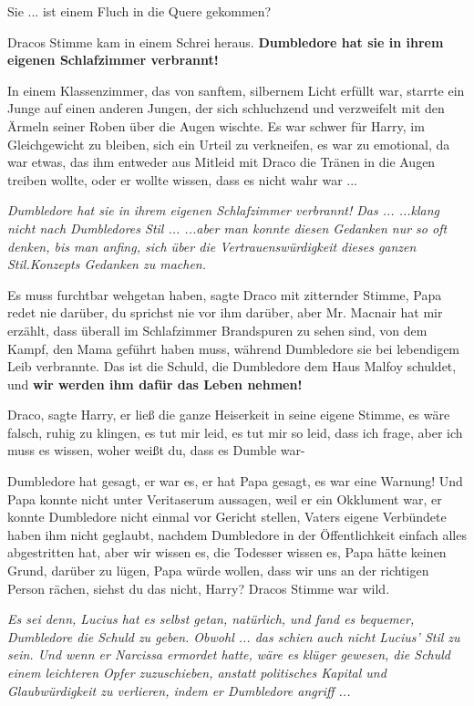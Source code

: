 \glqq{}Sie ... ist einem Fluch in die Quere gekommen?\grqq{}

Dracos Stimme kam in einem Schrei heraus. \glqq{}\textbf{Dumbledore hat sie in
ihrem eigenen Schlafzimmer verbrannt!}\grqq{}

In einem Klassenzimmer, das von sanftem, silbernem Licht erfüllt war, starrte
ein Junge auf einen anderen Jungen, der sich schluchzend und verzweifelt mit den
Ärmeln seiner Roben über die Augen wischte. Es war schwer für Harry, im
Gleichgewicht zu bleiben, sich ein Urteil zu verkneifen, es war zu emotional, da
war etwas, das ihm entweder aus Mitleid mit Draco die Tränen in die Augen
treiben wollte, oder er wollte wissen, dass es nicht wahr war ...

\emph{Dumbledore hat sie in ihrem eigenen Schlafzimmer verbrannt! Das ...
...klang nicht nach Dumbledores Stil ... ...aber man konnte diesen Gedanken nur
so oft denken, bis man anfing, sich über die Vertrauenswürdigkeit dieses ganzen
\glqq{}Stil\grqq{}.Konzepts Gedanken zu machen.}

\glqq{}Es muss furchtbar wehgetan haben\grqq{}, sagte Draco mit zitternder
Stimme, \glqq{}Papa redet nie darüber, du sprichst nie vor ihm darüber, aber Mr.
Macnair hat mir erzählt, dass überall im Schlafzimmer Brandspuren zu sehen sind,
von dem Kampf, den Mama geführt haben muss, während Dumbledore sie bei
lebendigem Leib verbrannte. Das ist die Schuld, die Dumbledore dem Haus Malfoy
schuldet, und \textbf{wir werden ihm dafür das Leben nehmen!}\grqq{}

\glqq{}Draco\grqq{}, sagte Harry, er ließ die ganze Heiserkeit in seine eigene
Stimme, es wäre falsch, ruhig zu klingen, \glqq{}es tut mir leid, es tut mir so
leid, dass ich frage, aber ich muss es wissen, woher weißt du, dass es Dumble
war-\grqq{}

\glqq{}Dumbledore hat gesagt, er war es, er hat Papa gesagt, es war eine
Warnung! Und Papa konnte nicht unter Veritaserum aussagen, weil er ein
Okklument war, er konnte Dumbledore nicht einmal vor Gericht stellen, Vaters
eigene Verbündete haben ihm nicht geglaubt, nachdem Dumbledore in der
Öffentlichkeit einfach alles abgestritten hat, aber wir wissen es, die Todesser
wissen es, Papa hätte keinen Grund, darüber zu lügen, Papa würde wollen, dass
wir uns an der richtigen Person rächen, siehst du das nicht, Harry?\grqq{}
Dracos Stimme war wild.

\emph{Es sei denn, Lucius hat es selbst getan, natürlich, und fand es bequemer,
Dumbledore die Schuld zu geben. Obwohl ... das schien auch nicht Lucius' Stil zu
sein. Und wenn er Narcissa ermordet hatte, wäre es klüger gewesen, die Schuld
einem leichteren Opfer zuzuschieben, anstatt politisches Kapital und
Glaubwürdigkeit zu verlieren, indem er Dumbledore angriff ...}

